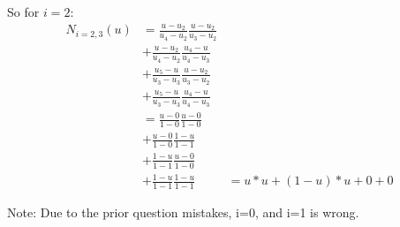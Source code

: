 So for $i=2$:
\begin{align*}
N_{i=2,3}(u)
            &= \frac {u - u_{2}} {u_{4} - u_{2}} \frac{u - u_{2}} {u_{3} - u_{2}} \\
            &+ \frac {u - u_{2}} {u_{4} - u_{2}}  \frac{u_{4} - u } { u_{4} - u_{3}} \\
            &+ \frac {u_{5} - u} { u_{3} - u_{3}} \frac {u - u_{2}} {u_{3} - u_{2}} \\
            &+ \frac {u_{5} - u} { u_{3} - u_{3}} \frac{u_{4} - u } { u_{4} - u_{3} } \\
            &= \frac {u - 0} {1 - 0} \frac{u - 0} {1 - 0} \\
            &+ \frac {u - 0} {1 - 0} \frac{1 - u } { 1 - 1} \\
            &+ \frac {1 - u} { 1 - 1} \frac {u - 0} {1 - 0} \\
            &+ \frac {1 - u} { 1 - 1} \frac{1 - u } {1 - 1} 
            &= u*u + (1-u)*u + 0 + 0
\end{align*}

Note: Due to the prior question mistakes, i=0, and i=1 is wrong.
